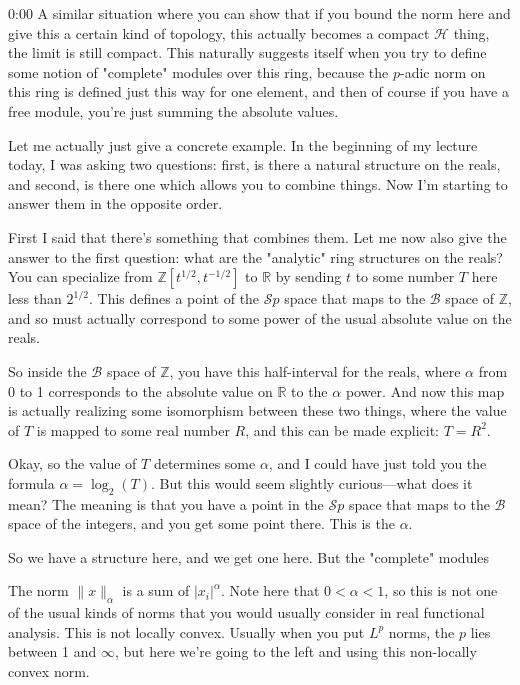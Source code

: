 \begin{unfinished}{0:00}
A similar situation where you can show that if you bound the norm here and give this a certain kind of topology, this actually becomes a compact $\mathcal{H}$ thing, the limit is still compact. This naturally suggests itself when you try to define some notion of "complete" modules over this ring, because the $p$-adic norm on this ring is defined just this way for one element, and then of course if you have a free module, you're just summing the absolute values.

Let me actually just give a concrete example. In the beginning of my lecture today, I was asking two questions: first, is there a natural structure on the reals, and second, is there one which allows you to combine things. Now I'm starting to answer them in the opposite order. 

First I said that there's something that combines them. Let me now also give the answer to the first question: what are the "analytic" ring structures on the reals? You can specialize from $\mathbb{Z}[t^{1/2}, t^{-1/2}]$ to $\mathbb{R}$ by sending $t$ to some number $T$ here less than $2^{1/2}$. This defines a point of the $\mathcal{S}p$ space that maps to the $\mathcal{B}$ space of $\mathbb{Z}$, and so must actually correspond to some power of the usual absolute value on the reals. 

So inside the $\mathcal{B}$ space of $\mathbb{Z}$, you have this half-interval for the reals, where $\alpha$ from 0 to 1 corresponds to the absolute value on $\mathbb{R}$ to the $\alpha$ power. And now this map is actually realizing some isomorphism between these two things, where the value of $T$ is mapped to some real number $R$, and this can be made explicit: $T = R^{2}$.

Okay, so the value of $T$ determines some $\alpha$, and I could have just told you the formula $\alpha = \log_2(T)$. But this would seem slightly curious---what does it mean? The meaning is that you have a point in the $\mathcal{S}p$ space that maps to the $\mathcal{B}$ space of the integers, and you get some point there. This is the $\alpha$. 

So we have a structure here, and we get one here. But the "complete" modules

The norm $\|x\|_\alpha$ is a sum of $|x_i|^\alpha$. Note here that $0 < \alpha < 1$, so this is not one of the usual kinds of norms that you would usually consider in real functional analysis. This is not locally convex. Usually when you put $L^p$ norms, the $p$ lies between 1 and $\infty$, but here we're going to the left and using this non-locally convex norm.


\end{unfinished}
